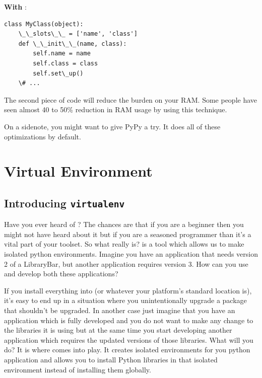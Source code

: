 \documentclass[a4paper,12pt,oneside]{sphinxmanual}
\begin{document}
\textbf{With} :
\begin{Verbatim}[commandchars=\\\{\}]
class MyClass(object):
    \_\_slots\_\_ = ['name', 'class']
    def \_\_init\_\_(name, class):
        self.name = name
        self.class = class
        self.set\_up()
    \# ...
\end{Verbatim}

The second piece of code will reduce the burden on your RAM. Some people
have seen almost 40 to 50\% reduction in RAM usage by using this
technique.

On a sidenote, you might want to give PyPy a try. It does all of these
optimizations by default.


\chapter{Virtual Environment}
\label{virtual_environment::doc}\label{virtual_environment:virtual-environment}

\section{Introducing \texttt{virtualenv}}
\label{virtual_environment:introducing-virtualenv}
Have you ever heard of ? The chances are that if you are a
beginner then you might not have heard about it but if you are a
seasoned programmer than it's a vital part of your toolset. So what
 really is?  is a tool which allows us to
make isolated python environments. Imagine you have an application that
needs version 2 of a LibraryBar, but another application requires
version 3. How can you use and develop both these applications?

If you install everything into  (or
whatever your platform's standard location is), it's easy to end up in a
situation where you unintentionally upgrade a package that shouldn't be
upgraded. In another case just imagine that you have an application
which is fully developed and you do not want to make any change to the
libraries it is using but at the same time you start developing another
application which requires the updated versions of those libraries. What
will you do? It is where  comes into play. It creates
isolated environments for you python application and allows you to
install Python libraries in that isolated environment instead of
installing them globally.
\end{document}
